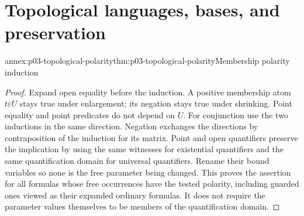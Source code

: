 \section{Topological languages, bases, and preservation}
\label{sec:p03-topological-models-annex}

\begin{annexitem}{annex:p03-topological-polarity}{thm:p03-topological-polarity}{Membership polarity induction}
\begin{proof}
Expand open equality before the induction. A positive membership atom
\(t\varepsilon U\) stays true under enlargement; its negation stays
true under shrinking. Point equality and point predicates do not depend
on \(U\). For conjunction use the two inductions in the same direction.
Negation exchanges the directions by contraposition of the induction
for its matrix. Point and open quantifiers preserve the implication by
using the same witnesses for existential quantifiers and the same
quantification domain for universal quantifiers. Rename their bound variables
so none is the free parameter being changed. This proves the assertion
for all formulas whose free occurrences have the tested polarity, including
guarded ones viewed as their expanded ordinary formulas. It does not require
the parameter values themselves to be members of the quantification domain.
\end{proof}
\end{annexitem}

